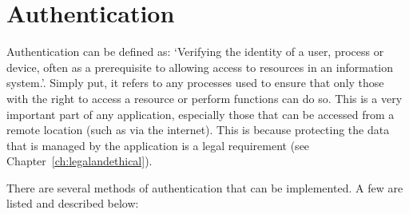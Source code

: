 \documentclass[11pt, a4paper,twoside]{report}
\theoremstyle{plain} %
\theoremstyle{definition} %
\numberwithin{equation}{chapter}
\begin{document}
\section{Authentication}\label{sec:backgroundauthentication}

Authentication can be defined as: `Verifying the identity of a user, process or
device, often as a prerequisite to allowing access to resources in an
information system.'\cite{authentication}. Simply put, it refers to any
processes used to ensure that only those with the right to access a resource or
perform functions can do so. This is a very important part of any application,
especially those that can be accessed from a remote location (such as via the
internet). This is because protecting the data that is managed by the
application is a legal requirement (see Chapter~\ref{ch:legalandethical}).

There are several methods of authentication that can be implemented. A few are
listed and described below:
\end{document}
